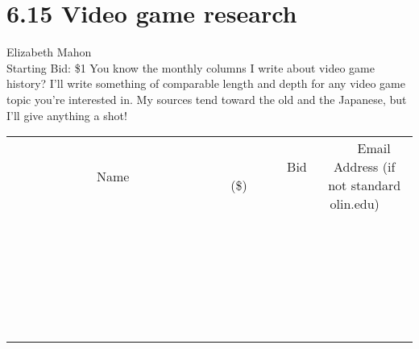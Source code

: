 \documentclass[11pt]{article}
\begin{document}
\section*{6.15 Video game research}
Elizabeth Mahon
\\
Starting Bid: \$1
\newline
You know the monthly columns I write about video game history? I'll write something of comparable length and depth for any video game topic you're interested in. My sources tend toward the old and the Japanese, but I'll give anything a shot!
\\[6ex]
\begin{tabular}{c c c}
~~~~~~~~~~~~~Name~~~~~~~~~~~~~ & ~~~~~~~~~Bid (\$)~~~~~~~~~  & ~~~Email Address (if not standard olin.edu)~~~\\
 & & \\
\hline
 & & \\
\hline
 & & \\
\hline
 & & \\
\hline
 & & \\
\hline
 & & \\
\hline
 & & \\
\hline
 & & \\
\hline
 & & \\
\hline
 & & \\
\hline
 & & \\
\hline
 & & \\
\hline
 & & \\
\hline
 & & \\
\hline
 & & \\
\hline
 & & \\
\hline
 & & \\
\hline
 & & \\
\hline
 & & \\
\hline
 & & \\
\hline
 & & \\
\hline
 & & \\
\hline
 & & \\
\hline
 & & \\
\hline
 & & \\
\hline
 & & \\
\hline
\end{tabular}
\newpage
\end{document}
